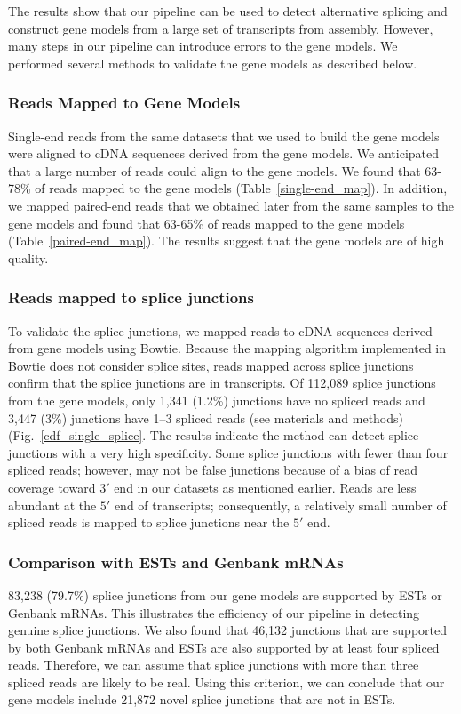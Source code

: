 \documentclass[10pt]{article}
\begin{document}
The results show that our pipeline can be used to detect alternative splicing and construct gene models from a large set of transcripts from assembly.
However, many steps in our pipeline can introduce errors to the gene models.
We performed several methods to validate the gene models as described below.

\subsubsection*{Reads Mapped to Gene Models}

Single-end reads from the same datasets that we used to build the gene models were aligned to cDNA sequences derived from the gene models.
We anticipated that a large number of reads could align to the gene models.
We found that 63-78\% of reads mapped to the gene models (Table~\ref{single-end_map}).
In addition, we mapped paired-end reads that we obtained later from the same samples to
the gene models and found that 63-65\% of reads mapped to the gene models (Table~\ref{paired-end_map}).
The results suggest that the gene models are of high quality.

\subsubsection*{Reads mapped to splice junctions}
To validate the splice junctions, we mapped reads to cDNA sequences derived from gene models using Bowtie\cite{Langmead:2009fv}.
Because the mapping algorithm implemented in Bowtie does not consider splice sites, reads mapped across splice junctions
confirm that the splice junctions are in transcripts.
Of 112,089 splice junctions from the gene models, only 1,341 (1.2\%) junctions have no spliced reads and 3,447 (3\%)
junctions have 1--3 spliced reads (see materials and methods) (Fig.~\ref{cdf_single_splice}.
The results indicate the method can detect splice junctions with a very high specificity.
Some splice junctions with fewer than four spliced reads; however, may not be false junctions because of a bias of
read coverage toward $3'$ end in our datasets as mentioned earlier.
Reads are less abundant at the $5'$ end of transcripts; consequently, a relatively small number of spliced reads is mapped
to splice junctions near the $5'$ end.

\subsubsection*{Comparison with ESTs and Genbank mRNAs}
83,238 (79.7\%) splice junctions from our gene models are supported by ESTs or Genbank mRNAs.
This illustrates the efficiency of our pipeline in detecting genuine splice junctions.
We also found that 46,132 junctions that are supported by both Genbank mRNAs and ESTs are also supported by at least four spliced reads.
Therefore, we can assume that splice junctions with more than three spliced reads are likely to be real.
Using this criterion, we can conclude that our gene models include 21,872 novel splice junctions that are not in ESTs.
\end{document}

